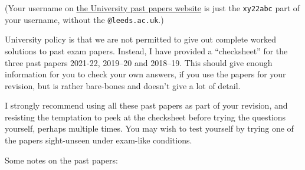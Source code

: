 \documentclass[
  letterpaper,
]{report}
\theoremstyle{definition}
\theoremstyle{definition}
\theoremstyle{remark}
\begin{document}
(Your username on
\href{https://students.leeds.ac.uk/exampapers?action=search\&keyword=MATH1710}{the
University past papers website} is just the \texttt{xy22abc} part of
your username, without the \texttt{@leeds.ac.uk}.)

University policy is that we are not permitted to give out complete
worked solutions to past exam papers. Instead, I have provided a
``checksheet'' for the three past papers 2021-22, 2019--20 and 2018--19.
This should give enough information for you to check your own answers,
if you use the papers for your revision, but is rather bare-bones and
doesn't give a lot of detail.

I strongly recommend using all these past papers as part of your
revision, and resisting the temptation to peek at the checksheet before
trying the questions yourself, perhaps multiple times. You may wish to
test yourself by trying one of the papers sight-unseen under exam-like
conditions.

Some notes on the past papers:
\end{document}
